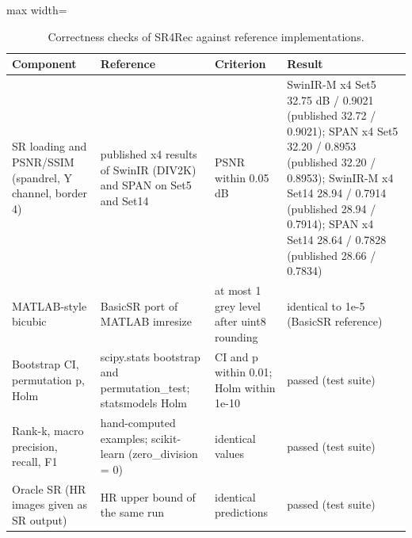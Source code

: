\begin{table}[H]
\centering
\footnotesize
\caption{Correctness checks of SR4Rec against reference implementations.}
\label{tab:validation}
\begin{adjustbox}{max width=\linewidth}
\begin{tabular}{>{\raggedright\arraybackslash}p{2.4cm}>{\raggedright\arraybackslash}p{3.0cm}>{\raggedright\arraybackslash}p{2.6cm}>{\raggedright\arraybackslash}p{4.6cm}}
\toprule
Component & Reference & Criterion & Result \\
\midrule
SR loading and PSNR/SSIM (spandrel, Y channel, border 4) & published x4 results of SwinIR (DIV2K) and SPAN on Set5 and Set14 & PSNR within 0.05 dB & SwinIR-M x4 Set5 32.75 dB / 0.9021 (published 32.72 / 0.9021); SPAN x4 Set5 32.20 / 0.8953 (published 32.20 / 0.8953); SwinIR-M x4 Set14 28.94 / 0.7914 (published 28.94 / 0.7914); SPAN x4 Set14 28.64 / 0.7828 (published 28.66 / 0.7834) \\
MATLAB-style bicubic & BasicSR port of MATLAB imresize & at most 1 grey level after uint8 rounding & identical to 1e-5 (BasicSR reference) \\
Bootstrap CI, permutation p, Holm & scipy.stats bootstrap and permutation\_\allowbreak{}test; statsmodels Holm & CI and p within 0.01; Holm within 1e-10 & passed (test suite) \\
Rank-k, macro precision, recall, F1 & hand-computed examples; scikit-learn (zero\_\allowbreak{}division = 0) & identical values & passed (test suite) \\
Oracle SR (HR images given as SR output) & HR upper bound of the same run & identical predictions & passed (test suite) \\
\bottomrule
\end{tabular}
\end{adjustbox}
\end{table}
